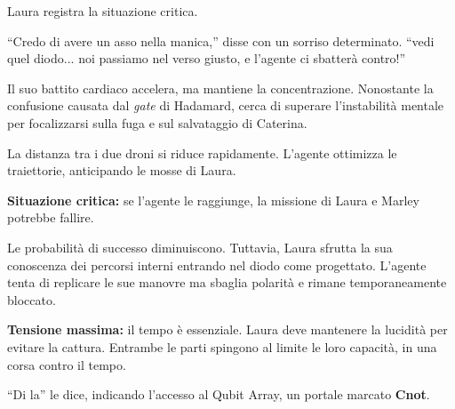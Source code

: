 Laura registra la situazione critica.

\begin{dialogue}
 ``Credo di avere un asso nella manica,'' disse con un sorriso determinato. ``vedi quel diodo...  noi passiamo nel verso giusto, e l'agente ci sbatterà contro!''

\end{dialogue}

Il suo battito cardiaco accelera, ma mantiene la concentrazione. Nonostante la confusione causata dal \textit{gate} di Hadamard, cerca di superare l'instabilità mentale per focalizzarsi sulla fuga e sul salvataggio di Caterina.

La distanza tra i due droni si riduce rapidamente. L'agente ottimizza le traiettorie, anticipando le mosse di Laura.

\textbf{Situazione critica:} se l'agente le raggiunge, la missione di Laura e Marley potrebbe fallire.

Le probabilità di successo diminuiscono. Tuttavia, Laura sfrutta la sua conoscenza dei percorsi interni entrando nel diodo come progettato. L'agente tenta di replicare le sue manovre ma sbaglia polarità e rimane temporaneamente bloccato.

\textbf{Tensione massima:} il tempo è essenziale. Laura deve mantenere la lucidità per evitare la cattura. Entrambe le parti spingono al limite le loro capacità, in una corsa contro il tempo.

\begin{dialogue}
 \enquote{Di la} le dice, indicando l'accesso al Qubit Array, un portale marcato \textbf{Cnot}.
\end{dialogue}

